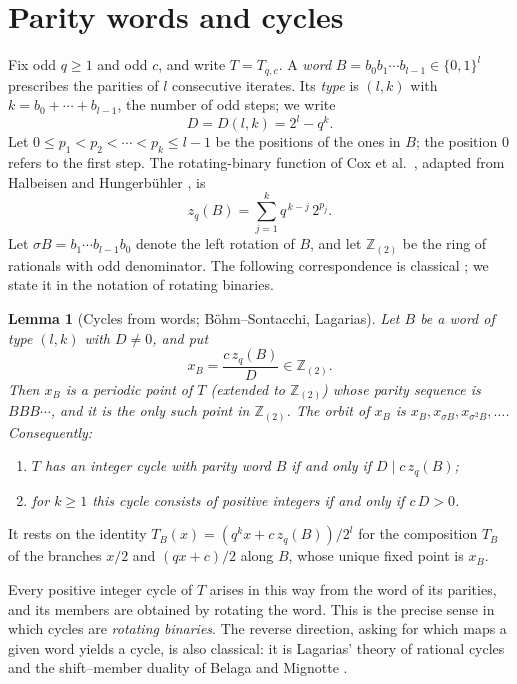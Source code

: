 \documentclass[12pt]{amsart}
\newtheorem{lemma}{Lemma}
\theoremstyle{definition}
\theoremstyle{remark}
\newcommand{\Zt}{\mathbb{Z}_{(2)}}
\begin{document}
\section{Parity words and cycles}
\label{sec:words}
Fix odd $q\ge1$ and odd $c$, and write $T=T_{q,c}$. A \emph{word} $B=b_0b_1\cdots b_{l-1}\in\{0,1\}^l$ prescribes the parities of $l$ consecutive iterates. Its \emph{type} is $(l,k)$ with $k=b_0+\cdots+b_{l-1}$, the number of odd steps; we write
\begin{equation}
\label{eq:D}
D=D(l,k)=2^l-q^k .
\end{equation}
Let $0\le p_1<p_2<\cdots<p_k\le l-1$ be the positions of the ones in $B$; the position $0$ refers to the first step. The rotating-binary function of Cox et al.\ \cite{Cox_2021}, adapted from Halbeisen and Hungerbühler \cite{Halbeisen_Hungerbuehler_1997}, is
\begin{equation}
z_q(B) = \sum_{j=1}^{k}q^{\,k-j}\,2^{p_j}.
\label{eq:z}
\end{equation}
Let $\sigma B=b_1\cdots b_{l-1}b_0$ denote the left rotation of $B$, and let $\Zt$ be the ring of rationals with odd denominator. The following correspondence is classical \cite{Boehm_Sontacchi_1978,Lagarias_1990}; we state it in the notation of rotating binaries.

\begin{lemma}[Cycles from words; B\"ohm--Sontacchi, Lagarias]
\label{lem:words}
Let $B$ be a word of type $(l,k)$ with $D\neq0$, and put
\[
x_B=\frac{c\,z_q(B)}{D}\in\Zt .
\]
Then $x_B$ is a periodic point of $T$ (extended to $\Zt$) whose parity sequence is $BBB\cdots$, and it is the only such point in $\Zt$. The orbit of $x_B$ is $x_B, x_{\sigma B}, x_{\sigma^2B},\ldots$. Consequently:
\begin{enumerate}[label=(\alph*)]
	\item $T$ has an integer cycle with parity word $B$ if and only if $D\mid c\,z_q(B)$;
	\item for $k\ge1$ this cycle consists of positive integers if and only if $c\,D>0$.
\end{enumerate}
\end{lemma}

It rests on the identity $T_B(x)=(q^kx+c\,z_q(B))/2^l$ for the composition $T_B$ of the branches $x/2$ and $(qx+c)/2$ along $B$, whose unique fixed point is $x_B$.

Every positive integer cycle of $T$ arises in this way from the word of its parities, and its members are obtained by rotating the word. This is the precise sense in which cycles are \emph{rotating binaries}. The reverse direction, asking for which maps a given word yields a cycle, is also classical: it is Lagarias' theory of rational cycles \cite{Lagarias_1990} and the shift--member duality of Belaga and Mignotte \cite[Theorem~4]{Belaga_Mignotte_DMTCS_2006}.
\end{document}

